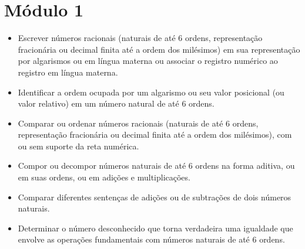 \chapter{Módulo 1}



\begin{itemize}
\item Escrever números racionais (naturais de até 6 ordens, representação
fracionária ou decimal finita até a ordem dos milésimos) em sua
representação por algarismos ou em língua materna ou associar o registro
numérico ao registro em língua materna.

\item Identificar a ordem ocupada por um algarismo ou seu valor posicional
(ou valor relativo) em um número natural de até 6 ordens.

\item Comparar ou ordenar números racionais (naturais de até 6 ordens,
representação fracionária ou decimal finita até a ordem dos milésimos),
com ou sem suporte da reta numérica.

\item Compor ou decompor números naturais de até 6 ordens na forma aditiva,
ou em suas ordens, ou em adições e multiplicações.

\item Comparar diferentes sentenças de adições ou de subtrações de dois
números naturais.

\item Determinar o número desconhecido que torna verdadeira uma igualdade
que envolve as operações fundamentais com números naturais de até 6
ordens.
\end{itemize}


